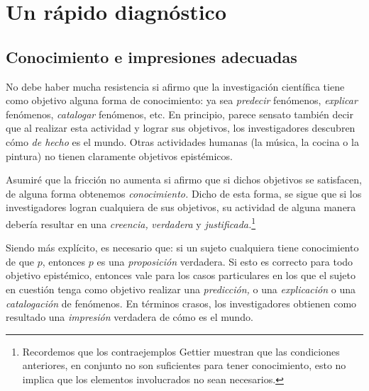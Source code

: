 
\chapter{Un rápido diagnóstico}

\section{Conocimiento e impresiones adecuadas}



\noindent No debe haber mucha resistencia si afirmo que la investigación científica
tiene como objetivo alguna forma de conocimiento: ya sea \textit{predecir} fenómenos,
\textit{explicar} fenómenos, \textit{catalogar} fenómenos, etc. En principio, parece
sensato también decir que al realizar esta actividad y lograr sus objetivos, los
investigadores descubren cómo \textit{de hecho} es el mundo. Otras actividades
humanas (la música, la cocina o la pintura) no tienen claramente objetivos
epistémicos.

Asumiré que la fricción no aumenta si afirmo que si dichos objetivos se satisfacen,
de alguna forma obtenemos \textit{conocimiento.} Dicho de esta forma, se sigue que si
los investigadores logran cualquiera de sus objetivos, su actividad de alguna manera
debería resultar en una \textit{creencia,} \textit{verdadera} y
\textit{justificada.}\footnote{ Recordemos que los contraejemplos Gettier muestran
que las condiciones anteriores, en conjunto no son suficientes
\parencite{gettier1963} para tener conocimiento, esto no implica que los elementos
involucrados no sean necesarios.}

Siendo más explícito, es necesario que: si un sujeto cualquiera tiene conocimiento de
que $p$, entonces $p$ es una \textit{proposición} verdadera. Si esto es correcto para
todo objetivo epistémico, entonces vale para los casos particulares en los que el
sujeto en cuestión tenga como objetivo realizar una \textit{predicción,} o una
\textit{explicación} o una \textit{catalogación} de fenómenos. En términos crasos,
los investigadores obtienen como resultado una \textit{impresión} verdadera de cómo
es el mundo.

